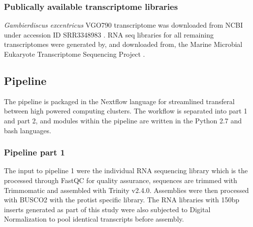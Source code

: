 \documentclass[12pt]{article}
\begin{document}
\subsubsection*{Publically available transcriptome libraries}
\emph{Gambierdiscus excentricus} VGO790 transcriptome was downloaded from NCBI under accession ID  SRR3348983 \cite{kohli2017role}.
RNA seq libraries for all remaining transcriptomes were generated by, and downloaded from, the Marine Microbial Eukaryote Transcriptome Sequencing Project \citep{keeling2014marine}.

\subsection*{Pipeline}
The pipeline is packaged in the Nextflow language for streamlined transferal between high powered computing clusters. 
The workflow is separated into part 1 and part 2, and modules within the pipeline are written in the Python 2.7 and bash languages.
\subsubsection*{Pipeline part 1}
The input to pipeline 1 were the individual RNA sequencing library which is the processed through FastQC for quality assurance, sequences are trimmed with Trimmomatic and assembled with Trinity v2.4.0. Assemblies were then processed with BUSCO2 with the protist specific library.
The RNA libraries with 150bp inserts generated as part of this study were also subjected to Digital Normalization to pool identical transcripts before assembly.                                                                                                                                                                                                                                                                                                                                                                                                                                                                                                                                                                                                                                                                                                                                                                                                                                                                                                                                                                                                                                                                                                                                                                                                                                                                                                                                           
\end{document}
